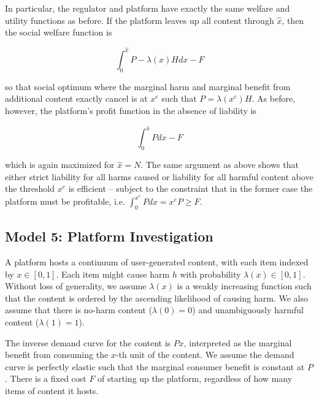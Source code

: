 In particular, the regulator and platform have exactly the same welfare and utility functions as before.  If the platform leaves up all content through $\hat{x}$, then the social welfare function is

\begin{equation}
\int_{0}^{\hat{x}} P - \lambda(x)H dx - F
\end{equation}

so that social optimum where the marginal harm and marginal benefit from additional content exactly cancel is at $x^e$ such that $P = \lambda(x^e)H$. As before, however, the platform's profit function in the absence of liability is

\begin{equation}
\int_{0}^{\hat{x}} P dx - F
\end{equation} 

which is again maximized for $\hat{x} = N$. The same argument as above shows that either strict liability for all harms caused or liability for all harmful content above the threshold $x^e$ is efficient -- subject to the constraint that in the former case the platform must be profitable, i.e. $\int_0^{x^e} P dx = x^eP \ge F$.

\subsection{Model 5: Platform Investigation}


A platform hosts a continuum of user-generated content, with each item indexed by $x\in[0,1]$. 
Each item might cause harm $h$ with probability $\lambda(x)\in[0,1]$. Without loss of generality, we assume $\lambda(x)$ is a weakly increasing function such that the content is ordered by the ascending likelihood of causing harm. We also assume that there is no-harm content ($\lambda(0)=0$) and unambiguously harmful content ($\lambda(1)=1$).


The inverse demand curve for the content is $Px$, interpreted as the marginal benefit from consuming the $x$-th unit of the content. We assume the demand curve is perfectly elastic such that the marginal consumer benefit is constant at $P$.
There is a fixed cost $F$ of starting up the platform, regardless of how many items of content it hosts.

